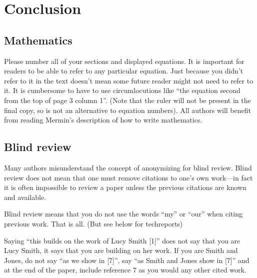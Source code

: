 \documentclass[10pt,twocolumn,letterpaper]{article}
\begin{document}

\section{Conclusion}




{\small


}

\clearpage
\clearpage
\clearpage

\subsection{Mathematics}

Please number all of your sections and displayed equations.  It is
important for readers to be able to refer to any particular equation.  Just
because you didn't refer to it in the text doesn't mean some future reader
might not need to refer to it.  It is cumbersome to have to use
circumlocutions like ``the equation second from the top of page 3 column
1''.  (Note that the ruler will not be present in the final copy, so is not
an alternative to equation numbers).  All authors will benefit from reading
Mermin's description of how to write mathematics.%


\subsection{Blind review}

Many authors misunderstand the concept of anonymizing for blind
review.  Blind review does not mean that one must remove
citations to one's own work---in fact it is often impossible to
review a paper unless the previous citations are known and
available.

Blind review means that you do not use the words ``my'' or ``our''
when citing previous work.  That is all.  (But see below for
techreports)

Saying ``this builds on the work of Lucy Smith [1]'' does not say
that you are Lucy Smith, it says that you are building on her
work.  If you are Smith and Jones, do not say ``as we show in
[7]'', say ``as Smith and Jones show in [7]'' and at the end of the
paper, include reference 7 as you would any other cited work.
\end{document}
